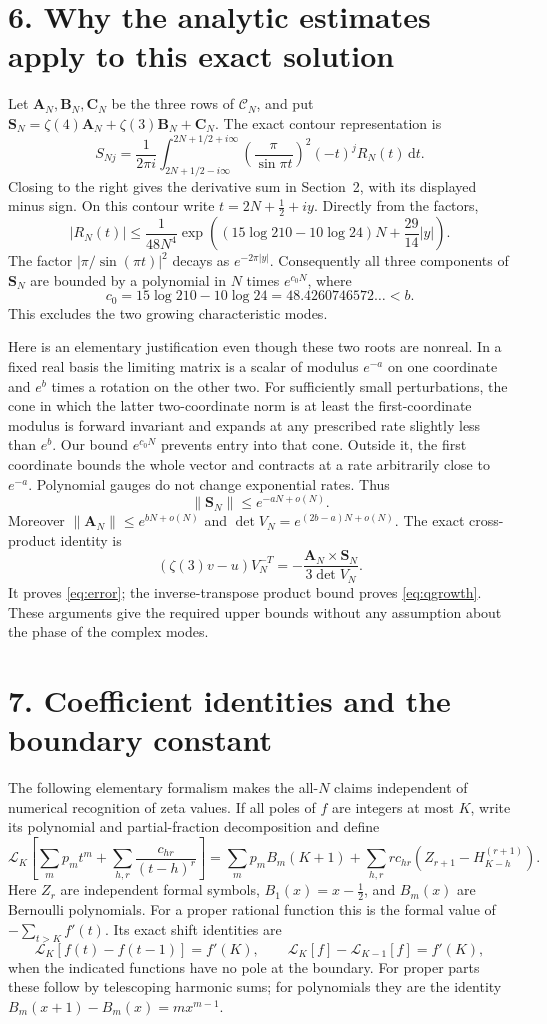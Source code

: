 \documentclass[11pt]{article}
\newcommand{\dd}{\mathrm d}
\newcommand{\z}{\zeta(3)}
\begin{document}
\section*{6. Why the analytic estimates apply to this exact solution}
Let $\mathbf A_N,\mathbf B_N,\mathbf C_N$ be the three rows of
$\mathcal C_N$, and put
$\mathbf S_N=\zeta(4)\mathbf A_N+\zeta(3)\mathbf B_N+\mathbf C_N$.
The exact contour representation is
\[
 S_{Nj}=\frac1{2\pi i}\int_{2N+1/2-i\infty}^{2N+1/2+i\infty}
 \left(\frac\pi{\sin\pi t}\right)^2(-t)^jR_N(t)\,\dd t.
\]
Closing to the right gives the derivative sum in Section~2, with its displayed
minus sign. On this contour write $t=2N+\tfrac12+iy$. Directly from the factors,
\[
 |R_N(t)|\le \frac1{48N^4}
 \exp\left((15\log210-10\log24)N+\frac{29}{14}|y|\right).
\]
The factor $|\pi/\sin(\pi t)|^2$ decays as $e^{-2\pi|y|}$.
Consequently all three components of $\mathbf S_N$ are bounded by a
polynomial in $N$ times $e^{c_0N}$, where
\[
 c_0=15\log210-10\log24=48.4260746572\ldots<b.
\]
This excludes the two growing characteristic modes.

Here is an elementary justification even though these two roots are
nonreal. In a fixed real basis the limiting matrix is a scalar of modulus
$e^{-a}$ on one coordinate and $e^b$ times a rotation on the other two.
For sufficiently small perturbations, the cone in which the latter
two-coordinate norm is at least the first-coordinate modulus is forward
invariant and expands at any prescribed rate slightly less than $e^b$.
Our bound $e^{c_0N}$ prevents entry into that cone. Outside it, the first
coordinate bounds the whole vector and contracts at a rate arbitrarily
close to $e^{-a}$. Polynomial gauges do not change exponential rates. Thus
\[
 \|\mathbf S_N\|\le e^{-aN+o(N)}.
\]
Moreover $\|\mathbf A_N\|\le e^{bN+o(N)}$ and
$\det V_N=e^{(2b-a)N+o(N)}$. The exact cross-product identity is
\[
 (\z v-u)V_N^{-T}
       =-\frac{\mathbf A_N\times\mathbf S_N}{3\det V_N}.
\]
It proves \eqref{eq:error}; the inverse-transpose product bound proves
\eqref{eq:qgrowth}. These arguments give the required upper bounds without
any assumption about the phase of the complex modes.

\section*{7. Coefficient identities and the boundary constant}
The following elementary formalism makes the all-$N$ claims independent of
numerical recognition of zeta values. If all poles of $f$ are integers at
most $K$, write its polynomial and partial-fraction decomposition and define
\[
 \mathcal L_K\!\left[\sum_m p_mt^m+
               \sum_{h,r}\frac{c_{hr}}{(t-h)^r}\right]
 =\sum_m p_m B_m(K+1)+
       \sum_{h,r}r c_{hr}(Z_{r+1}-H_{K-h}^{(r+1)}).
\]
Here $Z_r$ are independent formal symbols, $B_1(x)=x-\tfrac12$, and
$B_m(x)$ are Bernoulli polynomials. For a proper rational function this
is the formal value of $-\sum_{t>K}f'(t)$. Its exact shift identities are
\[
 \mathcal L_K[f(t)-f(t-1)]=f'(K),\qquad
 \mathcal L_K[f]-\mathcal L_{K-1}[f]=f'(K),
\]
when the indicated functions have no pole at the boundary.
For proper parts these follow by telescoping harmonic sums; for polynomials
they are the identity $B_m(x+1)-B_m(x)=mx^{m-1}$.
\end{document}
